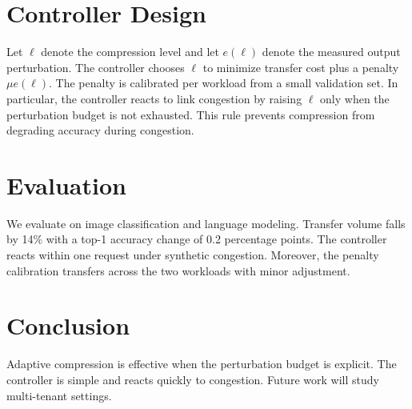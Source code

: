 \documentclass[conference]{IEEEtran}
\begin{document}
\section{Controller Design}
\label{sec:method}
Let $\ell$ denote the compression level and let $e(\ell)$ denote the measured output perturbation.
The controller chooses $\ell$ to minimize transfer cost plus a penalty $\mu e(\ell)$.
The penalty is calibrated per workload from a small validation set.
In particular, the controller reacts to link congestion by raising $\ell$ only when the perturbation budget is not exhausted.
This rule prevents compression from degrading accuracy during congestion.

\section{Evaluation}
\label{sec:eval}
We evaluate on image classification and language modeling.
Transfer volume falls by 14\% with a top-1 accuracy change of 0.2 percentage points.
The controller reacts within one request under synthetic congestion.
Moreover, the penalty calibration transfers across the two workloads with minor adjustment.

\section{Conclusion}
\label{sec:conclusion}
Adaptive compression is effective when the perturbation budget is explicit.
The controller is simple and reacts quickly to congestion.
Future work will study multi-tenant settings.
\end{document}
